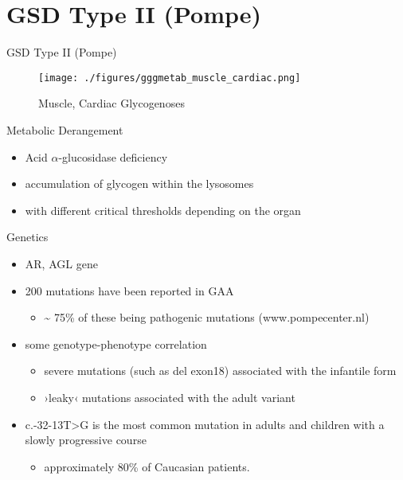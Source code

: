 \documentclass[presentation, smaller]{beamer}
\begin{document}
\section{GSD Type II (Pompe)}
\label{sec:org467f51d}
\begin{frame}[label={sec:org15d4cc5}]{GSD Type II (Pompe)}
\begin{figure}[htbp]
\centering
\texttt{[image: ./figures/gggmetab\_muscle\_cardiac.png]}
\caption[Muscle, Cardiac Glycogenoses]{\label{fig:org0371dfb}
Muscle, Cardiac Glycogenoses}
\end{figure}
\end{frame}

\begin{frame}[label={sec:orgbebdf83}]{Metabolic Derangement}
\begin{itemize}
\item Acid \(\alpha\)-glucosidase deficiency
\item accumulation of glycogen within the lysosomes
\item with different critical thresholds depending on the organ
\end{itemize}
\end{frame}

\begin{frame}[label={sec:orgdbbb809}]{Genetics}
\begin{itemize}
\item AR, AGL gene
\item 200 mutations have been reported in GAA
\begin{itemize}
\item \textasciitilde{} 75\% of these being pathogenic mutations (www.pompecenter.nl)
\end{itemize}
\item some genotype-phenotype correlation
\begin{itemize}
\item severe mutations (such as del exon18) associated with the infantile form
\item ›leaky‹ mutations associated with the adult variant
\end{itemize}
\item c.-32-13T>G is the most common mutation in adults and children with
a slowly progressive course
\begin{itemize}
\item approximately 80\% of Caucasian patients.
\end{itemize}
\end{itemize}
\end{frame}
\end{document}
